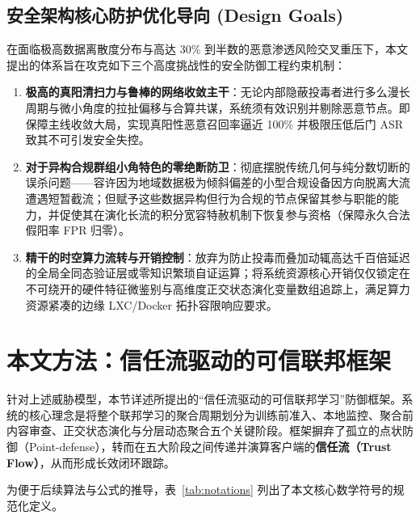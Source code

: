 \documentclass[11pt, a4paper, UTF8, fontset=fandol]{ctexart}
\begin{document}
\subsection{安全架构核心防护优化导向 (Design Goals)}
在面临极高数据离散度分布与高达 30\% 到半数的恶意渗透风险交叉重压下，本文提出的体系旨在攻克如下三个高度挑战性的安全防御工程约束机制：
\begin{enumerate}
    \item \textbf{极高的真阳清扫力与鲁棒的网络收敛主干}：无论内部隐蔽投毒者进行多么漫长周期与微小角度的拉扯偏移与合算共谋，系统须有效识别并剔除恶意节点。即保障主线收敛大局，实现真阳性恶意召回率逼近 100\% 并极限压低后门 ASR 致其不可引发安全失控。
    \item \textbf{对于异构合规群组小角特色的零绝断防卫}：彻底摆脱传统几何与纯分数切断的误杀问题——容许因为地域数据极为倾斜偏差的小型合规设备因方向脱离大流遭遇短暂截流；但赋予这些数据异构但行为合规的节点保留其参与职能的能力，并促使其在演化长流的积分宽容特赦机制下恢复参与资格（保障永久合法假阳率 FPR 归零）。
    \item \textbf{精干的时空算力流转与开销控制}：放弃为防止投毒而叠加动辄高达千百倍延迟的全局全同态验证层或零知识繁琐自证运算；将系统资源核心开销仅仅锁定在不可绕开的硬件特征微鉴别与高维度正交状态演化变量数组追踪上，满足算力资源紧凑的边缘 LXC/Docker 拓扑容限响应要求。
\end{enumerate}


\section{本文方法：信任流驱动的可信联邦框架}

针对上述威胁模型，本节详述所提出的“信任流驱动的可信联邦学习”防御框架。系统的核心理念是将整个联邦学习的聚合周期划分为训练前准入、本地监控、聚合前内容审查、正交状态演化与分层动态聚合五个关键阶段。框架摒弃了孤立的点状防御（Point-defense），转而在五大阶段之间传递并演算客户端的\textbf{信任流（Trust Flow）}，从而形成长效闭环跟踪。

为便于后续算法与公式的推导，表~\ref{tab:notations} 列出了本文核心数学符号的规范化定义。
\end{document}
